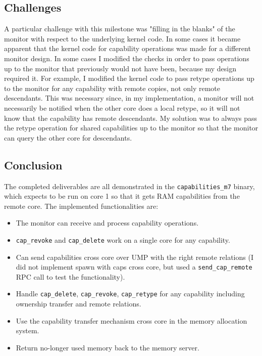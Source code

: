 \subsection{Challenges}
A particular challenge with this milestone was "filling in the blanks" of the monitor with respect to the underlying kernel code. In some cases it became apparent that the kernel code for capability operations was made for a different monitor design. In some cases I modified the checks in order to pass operations up to the monitor that previously would not have been, because my design required it. For example, I modified the kernel code to pass retype operations up to the monitor for any capability with remote copies, not only remote descendants. This was necessary since, in my implementation, a monitor will not necessarily be notified when the other core does a local retype, so it will not know that the capability has remote descendants. My solution was to always pass the retype operation for shared capabilities up to the monitor so that the monitor can query the other core for descendants.

\subsection{Conclusion}
The completed deliverables are all demonstrated in the \texttt{capabilities\_m7} binary, which expects to be run on core 1 so that it gets RAM capabilities from the remote core. The implemented functionalities are:
\begin{itemize}
    \item The monitor can receive and process capability operations.
    \item \texttt{cap\_revoke} and \texttt{cap\_delete} work on a single core for any capability.
    \item Can send capabilities cross core over UMP with the right remote relations (I did not implement spawn with caps cross core, but used a \texttt{send\_cap\_remote} RPC call to test the functionality).
    \item Handle \texttt{cap\_delete}, \texttt{cap\_revoke}, \texttt{cap\_retype} for any capability including ownership transfer and remote relations.
    \item Use the capability transfer mechanism cross core in the memory allocation system.
    \item Return no-longer used memory back to the memory server.
\end{itemize}
